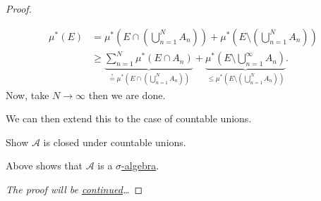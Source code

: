 \begin{proof}
\begin{enumerate}[(a)]
\begin{itemize}
\begin{explanation}
				            \[
					            \begin{split}
						            \mu^{\ast} (E)
						             & = \mu^{\ast} \left(E\cap \left(\bigcup_{n=1}^{N} A_{n}\right)\right) + \mu^{\ast} \left(E\setminus \left(\bigcup_{n=1}^{N} A_{n}\right)\right)                                                                                                                                                                                                                      \\
						             & \geq \underbrace{\sum_{n=1}^{N} \mu^{\ast} (E\cap A_{n})}_{ \overset{\hyperref[lma:disjoint-C-measurable-finite-additive]{!}}{=} \mu^{\ast} \left(E\cap \left(\bigcup_{n=1}^{N} A_{n}\right)\right)} + \underbrace{\mu^{\ast} \left(E\setminus \bigcup_{n=1}^{\infty} A_{n}\right)}_{\leq \mu^{\ast} \left(E\setminus \left(\bigcup_{n=1}^{N} A_{n}\right)\right)}.
					            \end{split}
				            \]
				            Now, take \(N\to \infty \) then we are done.
			            \end{explanation}
			            We can then extend this to the case of countable unions.
			            \begin{exercise}
				            Show \(\mathcal{A} \) is closed under countable unions.
			            \end{exercise}
		      \end{itemize}
		      Above shows that \(\mathcal{A} \) is a \hyperref[def:sigma-algebra]{\(\sigma\)-algebra}.
	\end{enumerate}
	\emph{The proof will be \hyperref[pf:thm:Caratheodory-extension-cont]{continued}\dots}
\end{proof}